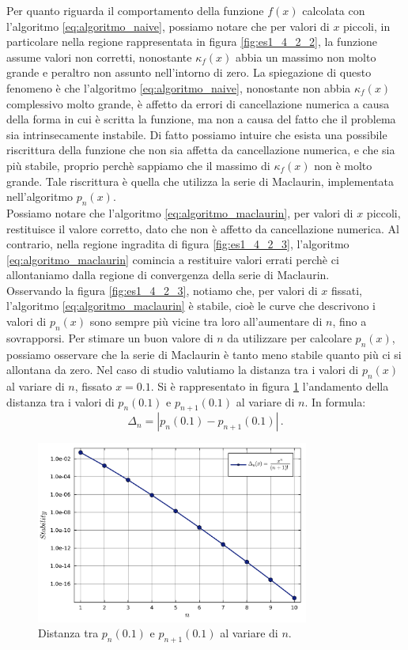 \documentclass[letterpaper, 12pt]{article}
\begin{document}
Per quanto riguarda il comportamento della funzione $f(x)$ calcolata con l'algoritmo \ref{eq:algoritmo_naive},
possiamo notare che per valori di $x$ piccoli, in particolare nella regione rappresentata in figura 
\ref{fig:es1_4_2_2}, la funzione assume valori non corretti, nonostante $\kappa_f(x)$ abbia un massimo non molto
grande e peraltro non assunto nell'intorno di zero. La spiegazione di questo fenomeno è che l'algoritmo
\ref{eq:algoritmo_naive}, nonostante non abbia $\kappa_f(x)$ complessivo molto grande, è affetto da errori 
di cancellazione numerica a causa della forma in cui è scritta la funzione, ma non a causa del fatto che 
il problema sia intrinsecamente instabile. Di fatto possiamo intuire che esista una possibile riscrittura
della funzione che non sia affetta da cancellazione numerica, e che sia più stabile, proprio perchè 
sappiamo che il massimo di $\kappa_f(x)$ non è molto grande. Tale riscrittura è quella che utilizza la
serie di Maclaurin, implementata nell'algoritmo $p_n(x)$. \\
Possiamo notare che l'algoritmo \ref{eq:algoritmo_maclaurin}, per valori di $x$ piccoli, restituisce il 
valore corretto, dato che non è affetto da cancellazione numerica. Al contrario, nella regione ingradita di 
figura \ref{fig:es1_4_2_3}, l'algoritmo \ref{eq:algoritmo_maclaurin} comincia a restituire valori errati
perchè ci allontaniamo dalla regione di convergenza della serie di Maclaurin. \\
Osservando la figura \ref{fig:es1_4_2_3}, notiamo che, per valori di $x$ fissati, l'algoritmo 
\ref{eq:algoritmo_maclaurin} è stabile, cioè le curve che descrivono i valori di $p_n(x)$ sono sempre più 
vicine tra loro all'aumentare di $n$, fino a sovrapporsi. Per stimare un buon valore di $n$ da utilizzare
per calcolare $p_n(x)$, possiamo osservare che la serie di Maclaurin è tanto meno stabile quanto più ci si
allontana da zero. Nel caso di studio valutiamo la distanza tra i valori di $p_n(x)$ al variare di $n$,
fissato $x = 0.1$. Si è rappresentato in figura \ref{fig:es1_4_2_4} l'andamento della distanza tra i valori
di $p_n(0.1)$ e $p_{n+1}(0.1)$ al variare di $n$. In formula:
\begin{equation}
    \Delta_n = |p_n(0.1) - p_{n+1}(0.1)|\,.
\end{equation}
\begin{figure}[ht!]
    \centering
    \includegraphics[width=0.8\textwidth]{1424.pdf}
    \caption{Distanza tra $p_n(0.1)$ e $p_{n+1}(0.1)$ al variare di $n$.}
    \label{fig:es1_4_2_4}
\end{figure}
\end{document}
